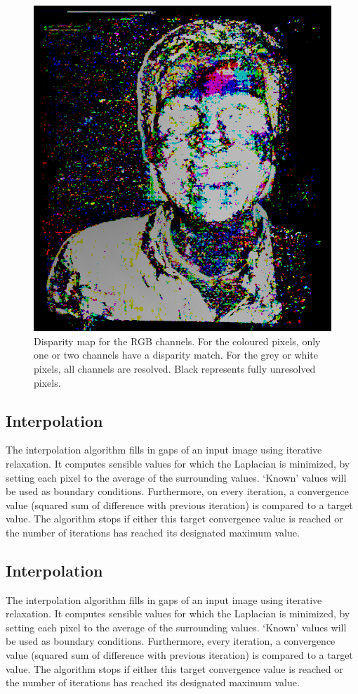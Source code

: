 \documentclass[journal]{IEEEtran}
\begin{document}
\begin{figure}[t]
    \centering
    \includegraphics[width=0.6\linewidth]{Pics/disparity-RGB.png}
    \caption{Disparity map for the RGB channels. For the coloured pixels, only one or two channels have a disparity match. For the grey or white pixels, all channels are resolved. Black represents fully unresolved pixels.}
    \label{fig:disparity-rgb}
\end{figure}


\subsection{Interpolation}
The interpolation algorithm fills in gaps of an input image using iterative relaxation. It computes sensible values for which the Laplacian is minimized, by setting each pixel to the average of the surrounding values. `Known' values will be used as boundary conditions. Furthermore, on every iteration, a convergence value (squared sum of difference with previous iteration) is compared to a target value. The algorithm stops if either this target convergence value is reached or the number of iterations has reached its designated maximum value.

\subsection{Interpolation}
\label{sec:interpolation}
The interpolation algorithm fills in gaps of an input image using iterative relaxation. It computes sensible values for which the Laplacian is minimized, by setting each pixel to the average of the surrounding values. `Known' values will be used as boundary conditions. Furthermore, every iteration, a convergence value (squared sum of difference with previous iteration) is compared to a target value. The algorithm stops if either this target convergence value is reached or the number of iterations has reached its designated maximum value. %
\end{document}
